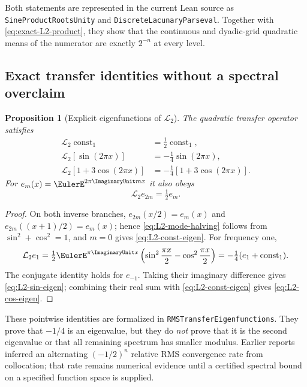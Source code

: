 \documentclass[11pt,oneside]{article}
\numberwithin{equation}{section}
\newtheorem{proposition}[theorem]{Proposition}
\theoremstyle{definition}
\theoremstyle{remark}
\newcommand{\lean}[1]{\texttt{#1}}
\newcommand{\ConstantOneFunction}{\operatorname{const}_{1}}
\begin{document}
Both statements are represented in the current Lean source as \lean{SineProductRootsUnity} and
\lean{DiscreteLacunaryParseval}.  Together with
\eqref{eq:exact-L2-product}, they show that the continuous and dyadic-grid quadratic means
of the numerator are exactly $2^{-n}$ at every level.

\subsection{Exact transfer identities without a spectral overclaim}

\begin{proposition}[Explicit eigenfunctions of $\mathcal L_2$]
\label{prop:L2-eigen-identities}
The quadratic transfer operator satisfies
\begin{align}
 \mathcal L_2\ConstantOneFunction&=\tfrac12\ConstantOneFunction,
 \label{eq:L2-const-eigen}\\
 \mathcal L_2[\sin(2\pi x)]&=-\tfrac14\sin(2\pi x),
 \label{eq:L2-sin-eigen}\\
 \mathcal L_2[1+3\cos(2\pi x)]&=-\tfrac14[1+3\cos(2\pi x)].
 \label{eq:L2-cos-eigen}
\end{align}
For $e_m(x)=\EulerE^{2\pi\ImaginaryUnit mx}$ it also obeys
\begin{equation}
 \mathcal L_2e_{2m}=\tfrac12e_m.
 \label{eq:L2-mode-halving}
\end{equation}
\end{proposition}

\begin{proof}
On both inverse branches, $e_{2m}(x/2)=e_m(x)$ and
$e_{2m}((x+1)/2)=e_m(x)$; hence \eqref{eq:L2-mode-halving} follows from
$\sin^2+\cos^2=1$, and $m=0$ gives \eqref{eq:L2-const-eigen}.  For frequency one,
\[
 \mathcal L_2e_1
 =\tfrac12\EulerE^{\pi\ImaginaryUnit x}
   \left(\sin^2\frac{\pi x}{2}-\cos^2\frac{\pi x}{2}\right)
 =-\tfrac14(e_1+\ConstantOneFunction).
\]
The conjugate identity holds for $e_{-1}$.  Taking their imaginary difference gives
\eqref{eq:L2-sin-eigen}; combining their real sum with
\eqref{eq:L2-const-eigen} gives \eqref{eq:L2-cos-eigen}.
\end{proof}

These pointwise identities are formalized in \lean{RMSTransferEigenfunctions}.  They prove
that $-1/4$ is an eigenvalue, but they do \emph{not} prove that it is the second eigenvalue
or that all remaining spectrum has smaller modulus.  Earlier reports inferred an alternating
$(-1/2)^n$ relative RMS convergence rate from collocation; that rate remains numerical
evidence until a certified spectral bound on a specified function space is supplied.
\end{document}
